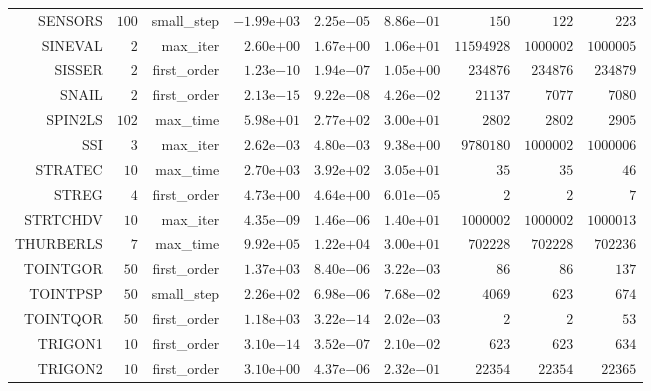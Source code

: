 \begin{longtable}{rrrrrrrrr}
SENSORS & \(   100\) & small\_step & \(-1.99\)e\(+03\) & \( 2.25\)e\(-05\) & \( 8.86\)e\(-01\) & \(   150\) & \(   122\) & \(   223\) \\
SINEVAL & \(     2\) & max\_iter & \( 2.60\)e\(+00\) & \( 1.67\)e\(+00\) & \( 1.06\)e\(+01\) & \(11594928\) & \(1000002\) & \(1000005\) \\
SISSER & \(     2\) & first\_order & \( 1.23\)e\(-10\) & \( 1.94\)e\(-07\) & \( 1.05\)e\(+00\) & \(234876\) & \(234876\) & \(234879\) \\
SNAIL & \(     2\) & first\_order & \( 2.13\)e\(-15\) & \( 9.22\)e\(-08\) & \( 4.26\)e\(-02\) & \( 21137\) & \(  7077\) & \(  7080\) \\
SPIN2LS & \(   102\) & max\_time & \( 5.98\)e\(+01\) & \( 2.77\)e\(+02\) & \( 3.00\)e\(+01\) & \(  2802\) & \(  2802\) & \(  2905\) \\
SSI & \(     3\) & max\_iter & \( 2.62\)e\(-03\) & \( 4.80\)e\(-03\) & \( 9.38\)e\(+00\) & \(9780180\) & \(1000002\) & \(1000006\) \\
STRATEC & \(    10\) & max\_time & \( 2.70\)e\(+03\) & \( 3.92\)e\(+02\) & \( 3.05\)e\(+01\) & \(    35\) & \(    35\) & \(    46\) \\
STREG & \(     4\) & first\_order & \( 4.73\)e\(+00\) & \( 4.64\)e\(+00\) & \( 6.01\)e\(-05\) & \(     2\) & \(     2\) & \(     7\) \\
STRTCHDV & \(    10\) & max\_iter & \( 4.35\)e\(-09\) & \( 1.46\)e\(-06\) & \( 1.40\)e\(+01\) & \(1000002\) & \(1000002\) & \(1000013\) \\
THURBERLS & \(     7\) & max\_time & \( 9.92\)e\(+05\) & \( 1.22\)e\(+04\) & \( 3.00\)e\(+01\) & \(702228\) & \(702228\) & \(702236\) \\
TOINTGOR & \(    50\) & first\_order & \( 1.37\)e\(+03\) & \( 8.40\)e\(-06\) & \( 3.22\)e\(-03\) & \(    86\) & \(    86\) & \(   137\) \\
TOINTPSP & \(    50\) & small\_step & \( 2.26\)e\(+02\) & \( 6.98\)e\(-06\) & \( 7.68\)e\(-02\) & \(  4069\) & \(   623\) & \(   674\) \\
TOINTQOR & \(    50\) & first\_order & \( 1.18\)e\(+03\) & \( 3.22\)e\(-14\) & \( 2.02\)e\(-03\) & \(     2\) & \(     2\) & \(    53\) \\
TRIGON1 & \(    10\) & first\_order & \( 3.10\)e\(-14\) & \( 3.52\)e\(-07\) & \( 2.10\)e\(-02\) & \(   623\) & \(   623\) & \(   634\) \\
TRIGON2 & \(    10\) & first\_order & \( 3.10\)e\(+00\) & \( 4.37\)e\(-06\) & \( 2.32\)e\(-01\) & \( 22354\) & \( 22354\) & \( 22365\) \\

\end{longtable}
